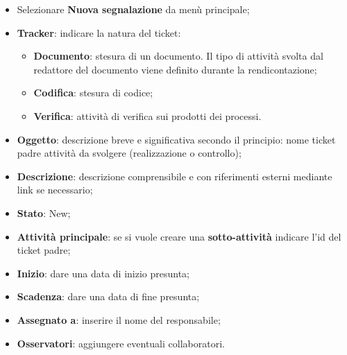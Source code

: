 		\begin{itemize}
		
		\item Selezionare \textbf{Nuova segnalazione} da menù principale; 
		\item \textbf{Tracker}: indicare la natura del ticket: 
		\begin{itemize}
	\item \textbf{Documento}: stesura di un documento. Il tipo di attività svolta dal redattore del documento viene definito durante la rendicontazione; 
	\item \textbf{Codifica}: stesura di codice; 
	\item \textbf{Verifica}: attività di verifica sui prodotti dei processi. 

	\end{itemize}

\item \textbf{Oggetto}: descrizione breve e significativa secondo il principio: nome ticket padre attività da svolgere (realizzazione o controllo); 
\item \textbf{Descrizione}: descrizione comprensibile e con riferimenti esterni mediante link se 
necessario; 

\item \textbf{Stato}: New; 
\item \textbf{Attività principale}: se si vuole creare una \textbf{sotto-attività} indicare l’id del ticket 
padre; 
\item \textbf{Inizio}: dare una data di inizio presunta; 
\item \textbf{Scadenza}: dare una data di fine presunta; 
\item \textbf{Assegnato a}: inserire il nome del responsabile; 
\item \textbf{Osservatori}: aggiungere eventuali collaboratori. 
\end{itemize} 

\label{sec:TicketVerifica}

